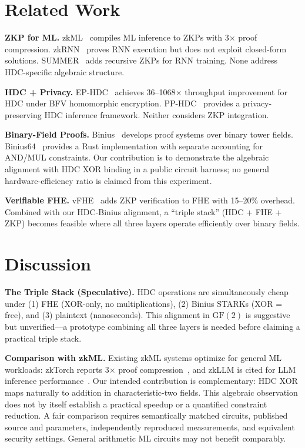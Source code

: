 \documentclass[11pt,twocolumn]{article}
\begin{document}
\section{Related Work}

\textbf{ZKP for ML.} zkML~\cite{zkml2024} compiles ML inference to ZKPs with 3$\times$ proof compression. zkRNN~\cite{zkrnn2026} proves RNN execution but does not exploit closed-form solutions. SUMMER~\cite{summer2025} adds recursive ZKPs for RNN training. None address HDC-specific algebraic structure.

\textbf{HDC + Privacy.} EP-HDC~\cite{ephdc2025} achieves 36--1068$\times$ throughput improvement for HDC under BFV homomorphic encryption. PP-HDC~\cite{pphdc2024} provides a privacy-preserving HDC inference framework. Neither considers ZKP integration.

\textbf{Binary-Field Proofs.} Binius~\cite{diamond2023binius} develops proof systems over binary tower fields. Binius64~\cite{binius64} provides a Rust implementation with separate accounting for AND/MUL constraints. Our contribution is to demonstrate the algebraic alignment with HDC XOR binding in a public circuit harness; no general hardware-efficiency ratio is claimed from this experiment.

\textbf{Verifiable FHE.} vFHE~\cite{vfhe2023} adds ZKP verification to FHE with 15--20\% overhead. Combined with our HDC-Binius alignment, a ``triple stack'' (HDC + FHE + ZKP) becomes feasible where all three layers operate efficiently over binary fields.

\section{Discussion}

\textbf{The Triple Stack (Speculative).} HDC operations are simultaneously cheap under (1) FHE (XOR-only, no multiplications), (2) Binius STARKs (XOR = free), and (3) plaintext (nanoseconds). This alignment in $\mathrm{GF}(2)$ is suggestive but unverified---a prototype combining all three layers is needed before claiming a practical triple stack.

\textbf{Comparison with zkML.} Existing zkML systems optimize for general ML workloads: zkTorch reports 3$\times$ proof compression~\cite{zkml2024}, and zkLLM is cited for LLM inference performance~\cite{zkllm}. Our intended contribution is complementary: HDC XOR maps naturally to addition in characteristic-two fields. This algebraic observation does not by itself establish a practical speedup or a quantified constraint reduction. A fair comparison requires semantically matched circuits, published source and parameters, independently reproduced measurements, and equivalent security settings. General arithmetic ML circuits may not benefit comparably.
\end{document}
